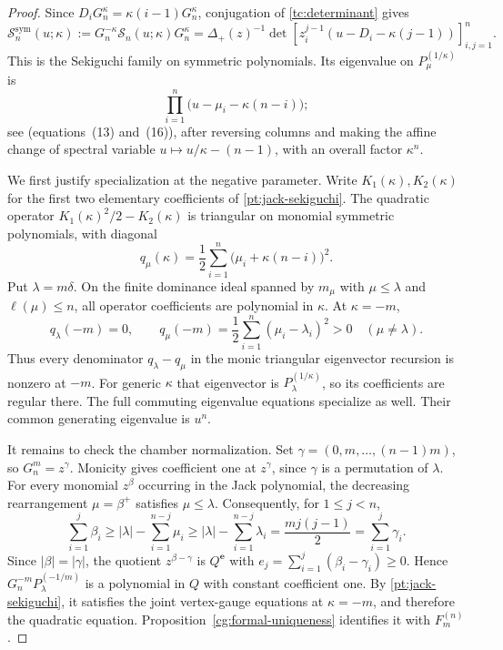 \documentclass[11pt]{amsart}
\theoremstyle{definition}
\theoremstyle{remark}
\numberwithin{equation}{section}
\begin{document}
\begin{proof}
Since $D_iG_n^\kappa=\kappa(i-1)G_n^\kappa$, conjugation of
\eqref{tc:determinant} gives
\begin{equation}\label{pt:jack-sekiguchi}
 \mathscr S_n^{\mathrm{sym}}(u;\kappa)
 :=G_n^{-\kappa}\mathscr S_n(u;\kappa)G_n^\kappa
 =\Delta_+(z)^{-1}
   \det\left[z_i^{j-1}(u-D_i-\kappa(j-1))\right]_{i,j=1}^n.
\end{equation}
This is the Sekiguchi family on symmetric polynomials. Its
eigenvalue on $P_\mu^{(1/\kappa)}$ is
\[
 \prod_{i=1}^n\bigl(u-\mu_i-\kappa(n-i)\bigr);
\]
see \cite{NS13} (equations~(13) and~(16)), after reversing columns
and making the affine change of spectral variable
$u\mapsto u/\kappa-(n-1)$, with an overall factor $\kappa^n$.

We first justify specialization at the negative parameter.
Write $K_1(\kappa),K_2(\kappa)$ for the first two elementary
coefficients of \eqref{pt:jack-sekiguchi}. The quadratic
operator $K_1(\kappa)^2/2-K_2(\kappa)$ is triangular on
monomial symmetric polynomials, with diagonal
\[
 q_\mu(\kappa)
 =\frac12\sum_{i=1}^n\bigl(\mu_i+\kappa(n-i)\bigr)^2.
\]
Put $\lambda=m\delta$. On the finite dominance ideal spanned
by $m_\mu$ with $\mu\leq\lambda$ and $\ell(\mu)\leq n$,
all operator coefficients are polynomial in $\kappa$.
At $\kappa=-m$,
\[
 q_\lambda(-m)=0,\qquad
 q_\mu(-m)=\frac12\sum_{i=1}^n(\mu_i-\lambda_i)^2>0
 \quad(\mu\ne\lambda).
\]
Thus every denominator $q_\lambda-q_\mu$ in the monic
triangular eigenvector recursion is nonzero at $-m$.
For generic $\kappa$ that eigenvector is
$P_\lambda^{(1/\kappa)}$, so its coefficients are regular
there. The full commuting eigenvalue equations specialize as
well. Their common generating eigenvalue is $u^n$.

It remains to check the chamber normalization. Set
$\gamma=(0,m,\ldots,(n-1)m)$, so $G_n^m=z^\gamma$.
Monicity gives coefficient one at $z^\gamma$, since
$\gamma$ is a permutation of $\lambda$.
For every monomial $z^\beta$ occurring in the Jack polynomial,
the decreasing rearrangement $\mu=\beta^+$ satisfies
$\mu\leq\lambda$. Consequently, for $1\leq j<n$,
\[
 \sum_{i=1}^j\beta_i
 \geq |\lambda|-\sum_{i=1}^{n-j}\mu_i
 \geq |\lambda|-\sum_{i=1}^{n-j}\lambda_i
 =\frac{mj(j-1)}2
 =\sum_{i=1}^j\gamma_i.
\]
Since $|\beta|=|\gamma|$, the quotient
$z^{\beta-\gamma}$ is $Q^{\boldsymbol e}$ with
$e_j=\sum_{i=1}^j(\beta_i-\gamma_i)\geq0$.
Hence $G_n^{-m}P_\lambda^{(-1/m)}$ is a polynomial in $Q$
with constant coefficient one.
By \eqref{pt:jack-sekiguchi}, it satisfies the joint
vertex-gauge equations at $\kappa=-m$, and therefore the
quadratic equation. Proposition~\ref{cg:formal-uniqueness}
identifies it with $F_m^{(n)}$.
\end{proof}
\end{document}
